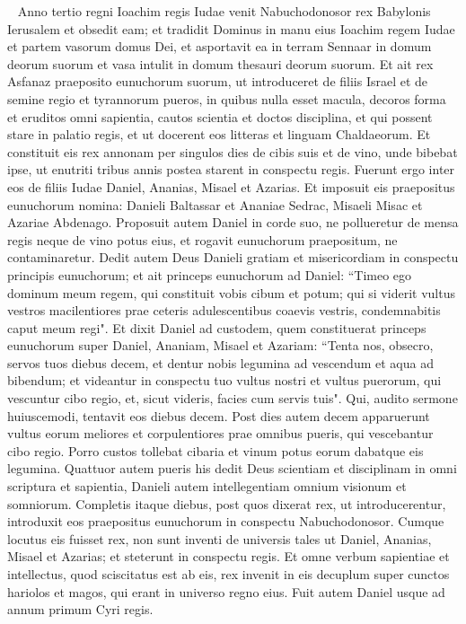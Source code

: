 
\begin{biblechapter}   
\verse Anno tertio regni Ioachim regis Iudae venit Nabuchodonosor rex Babylonis Ierusalem et obsedit eam; 
\verse et tradidit Dominus in manu eius Ioachim regem Iudae et partem vasorum domus Dei, et asportavit ea in terram Sennaar in domum deorum suorum et vasa intulit in domum thesauri deorum suorum. 
\verse Et ait rex Asfanaz praeposito eunuchorum suorum, ut introduceret de filiis Israel et de semine regio et tyrannorum 
\verse pueros, in quibus nulla esset macula, decoros forma et eruditos omni sapientia, cautos scientia et doctos disciplina, et qui possent stare in palatio regis, et ut docerent eos litteras et linguam Chaldaeorum. 
\verse Et constituit eis rex annonam per singulos dies de cibis suis et de vino, unde bibebat ipse, ut enutriti tribus annis postea starent in conspectu regis. 
\verse Fuerunt ergo inter eos de filiis Iudae Daniel, Ananias, Misael et Azarias. 
\verse Et imposuit eis praepositus eunuchorum nomina: Danieli Baltassar et Ananiae Sedrac, Misaeli Misac et Azariae Abdenago. 
\verse Proposuit autem Daniel in corde suo, ne pollueretur de mensa regis neque de vino potus eius, et rogavit eunuchorum praepositum, ne contaminaretur. 
\verse Dedit autem Deus Danieli gratiam et misericordiam in conspectu principis eunuchorum; 
\verse et ait princeps eunuchorum ad Daniel: “Timeo ego dominum meum regem, qui constituit vobis cibum et potum; qui si viderit vultus vestros macilentiores prae ceteris adulescentibus coaevis vestris, condemnabitis caput meum regi". 
\verse Et dixit Daniel ad custodem, quem constituerat princeps eunuchorum super Daniel, Ananiam, Misael et Azariam: 
\verse “Tenta nos, obsecro, servos tuos diebus decem, et dentur nobis legumina ad vescendum et aqua ad bibendum; 
\verse et videantur in conspectu tuo vultus nostri et vultus puerorum, qui vescuntur cibo regio, et, sicut videris, facies cum servis tuis". 
\verse Qui, audito sermone huiuscemodi, tentavit eos diebus decem. 
\verse Post dies autem decem apparuerunt vultus eorum meliores et corpulentiores prae omnibus pueris, qui vescebantur cibo regio. 
\verse Porro custos tollebat cibaria et vinum potus eorum dabatque eis legumina. 
\verse Quattuor autem pueris his dedit Deus scientiam et disciplinam in omni scriptura et sapientia, Danieli autem intellegentiam omnium visionum et somniorum. 
\verse Completis itaque diebus, post quos dixerat rex, ut introducerentur, introduxit eos praepositus eunuchorum in conspectu Nabuchodonosor. 
\verse Cumque locutus eis fuisset rex, non sunt inventi de universis tales ut Daniel, Ananias, Misael et Azarias; et steterunt in conspectu regis. 
\verse Et omne verbum sapientiae et intellectus, quod sciscitatus est ab eis, rex invenit in eis decuplum super cunctos hariolos et magos, qui erant in universo regno eius. 
\verse Fuit autem Daniel usque ad annum primum Cyri regis. 
\end{biblechapter}

